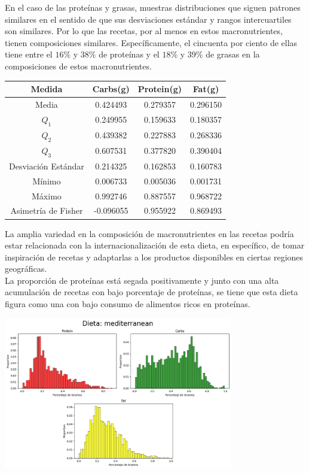 \documentclass[12pt,a4paper]{article}
\begin{document}
        En el caso de las proteínas y grasas, muestras distribuciones que siguen 
        patrones similares en el sentido de que sus desviaciones estándar y rangos 
        intercuartiles son similares. Por lo que las recetas, por al menos en estos 
        macronutrientes, tienen composiciones similares. Específicamente, el cincuenta 
        por ciento de ellas tiene entre el $16\%$ y $38\%$ de proteínas	y el $18\%$ y 
        $39\%$ de grasas en la composiciones de estos macronutrientes.
        \begin{center}
            \begin{tabular}{|c|ccc|}
                \hline
                Medida & Carbs(g) & Protein(g) & Fat(g) \\
                \hline
                Media               & 0.424493 & 0.279357 & 0.296150  \\
                $Q_1$               & 0.249955 & 0.159633 & 0.180357  \\
                $Q_2$               & 0.439382 & 0.227883 & 0.268336  \\
                $Q_3$               & 0.607531 & 0.377820 & 0.390404  \\
                Desviación Estándar & 0.214325 & 0.162853 & 0.160783  \\
                Mínimo              & 0.006733 & 0.005036 & 0.001731  \\
                Máximo              & 0.992746 & 0.887557 & 0.968722  \\
                Asimetría de Fisher & -0.096055 & 0.955922 & 0.869493 \\
                \hline
            \end{tabular}
        \end{center}
        La amplia variedad en la composición de macronutrientes en las recetas podría 
        estar relacionada con la internacionalización de esta dieta, en específico, de 
        tomar inspiración de recetas y adaptarlas a los productos disponibles en 
        ciertas regiones geográficas.\\

        La proporción de proteínas está segada positivamente y junto con una 
        alta acumulación de recetas con bajo porcentaje de proteínas, se tiene que 
        esta dieta figura como una con bajo consumo de alimentos ricos en proteínas. 
        \begin{center}
            \includegraphics[width=0.75\textwidth]{Resources/2_03_plot_03.png}
        \end{center}
\end{document}

